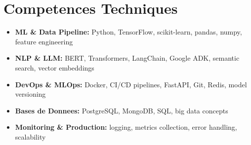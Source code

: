 \documentclass[a4paper,11pt]{article}
\begin{document}
\section{Competences Techniques}
\begin{itemize}[leftmargin=*, nosep]
    \item \small{\textbf{ML \& Data Pipeline:} Python, TensorFlow, scikit-learn, pandas, numpy, feature engineering}
    \item \small{\textbf{NLP \& LLM:} BERT, Transformers, LangChain, Google ADK, semantic search, vector embeddings}
    \item \small{\textbf{DevOps \& MLOps:} Docker, CI/CD pipelines, FastAPI, Git, Redis, model versioning}
    \item \small{\textbf{Bases de Donnees:} PostgreSQL, MongoDB, SQL, big data concepts}
    \item \small{\textbf{Monitoring \& Production:} logging, metrics collection, error handling, scalability}
\end{itemize}
\end{document}
